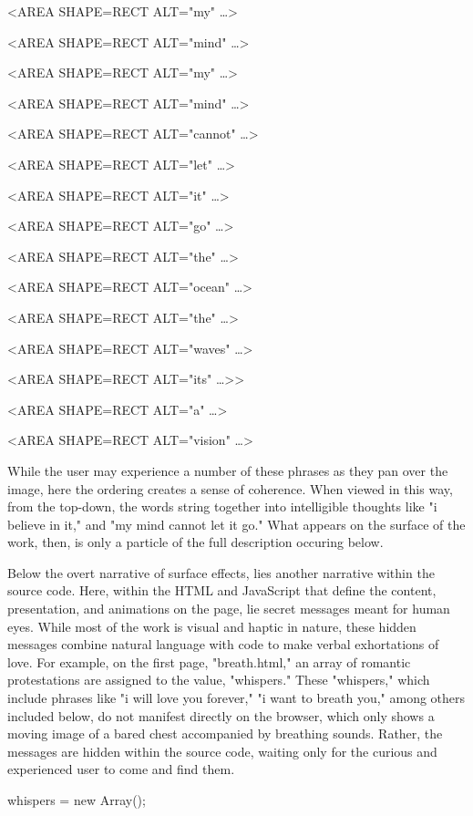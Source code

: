 \documentclass[11pt]{article}
\begin{document}
\begin{enumerate}
\begin{SOURCE}
<AREA SHAPE=RECT ALT="my" \ldots{}>

<AREA SHAPE=RECT ALT="mind" \ldots{}>

<AREA SHAPE=RECT ALT="my" \ldots{}>

<AREA SHAPE=RECT ALT="mind" \ldots{}>

<AREA SHAPE=RECT ALT="cannot" \ldots{}>

<AREA SHAPE=RECT ALT="let" \ldots{}>

<AREA SHAPE=RECT ALT="it" \ldots{}>

<AREA SHAPE=RECT ALT="go" \ldots{}>

<AREA SHAPE=RECT ALT="the" \ldots{}>

<AREA SHAPE=RECT ALT="ocean" \ldots{}>

<AREA SHAPE=RECT ALT="the" \ldots{}>

<AREA SHAPE=RECT ALT="waves" \ldots{}>

<AREA SHAPE=RECT ALT="its" \ldots{}>>

<AREA SHAPE=RECT ALT="a" \ldots{}>

<AREA SHAPE=RECT ALT="vision" \ldots{}>
\end{SOURCE}
While the user may experience a number of these phrases as they pan
over the image, here the ordering creates a sense of coherence. When
viewed in this way, from the top-down, the words string together into
intelligible thoughts like "i believe in it," and "my mind cannot let
it go." What appears on the surface of the work, then, is only a
particle of the full description occuring below. 

Below the overt narrative of surface effects, lies another narrative
within the source code. Here, within the HTML and JavaScript that
define the content, presentation, and animations on the page, lie
secret messages meant for human eyes. While most of the work is visual
and haptic in nature, these hidden messages combine natural language
with code to make verbal exhortations of love. For example, on the
first page, "breath.html," an array of romantic protestations are
assigned to the value, "whispers." These "whispers," which include
phrases like "i will love you forever," "i want to breath you," among
others included below, do not manifest directly on the browser, which
only shows a moving image of a bared chest accompanied by breathing
sounds. Rather, the messages are hidden within the source code,
waiting only for the curious and experienced user to come and find
them.
\begin{SOURCE}
whispers = new Array();


\end{SOURCE}
\end{enumerate}
\end{document}
